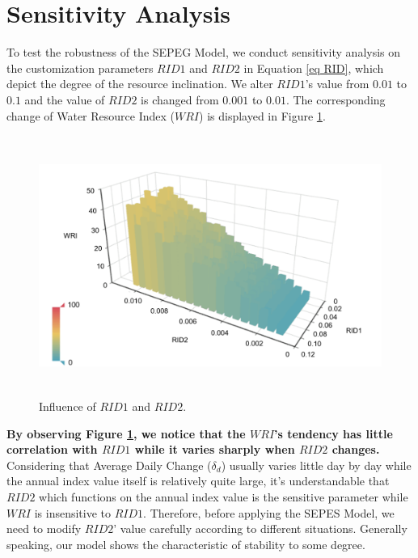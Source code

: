 \documentclass{mcmthesis}
\begin{document}
\section{Sensitivity Analysis}
To test the robustness of the SEPEG Model, we conduct sensitivity analysis on the customization parameters $RID1$ and $RID2$ in Equation \eqref{eq RID}, which depict the degree of the resource inclination. We alter $RID1$'s value from $0.01$ to $0.1$ and the value of $RID2$ is changed from $0.001$ to $0.01$. The corresponding change of Water Resource Index ($WRI$) is displayed in Figure \ref{fig:SA}.

\begin{figure}[H]
	\centering
	\includegraphics[height=8.5cm]{SA.png} 
	\caption{Influence of $RID1$ and $RID2$.}
	\label{fig:SA}
\end{figure}

\textbf{By observing Figure \ref{fig:SA}, we notice that the $WRI$'s tendency has little correlation with $RID1$ while it varies sharply when $RID2$ changes.} Considering that Average Daily Change ($\delta_d$) usually varies little day by day while the annual index value itself is relatively quite large, it's understandable that $RID2$ which functions on the annual index value is the sensitive parameter while $WRI$ is insensitive to $RID1$. Therefore, before applying the SEPES Model, we need to modify $RID2$' value carefully according to different situations. Generally speaking, our model shows the characteristic of stability to some degree.
\end{document}
